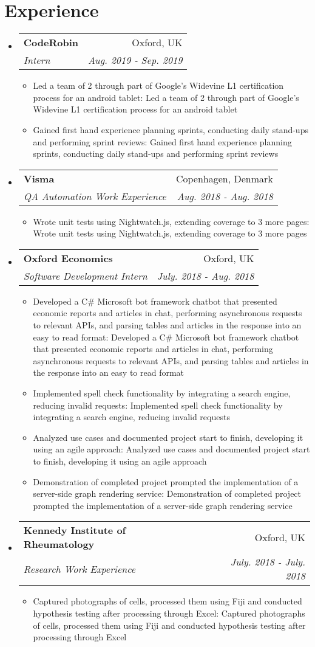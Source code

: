 \documentclass[a4paper,11pt]{article}
\makeatletter
\def \ifempty#1{\def\temp{#1} \ifx\temp\empty }
\newcommand{\resumeItem}[2]{
  \item\small{
  	\ifempty{#1}#2\else\textbf{#1}{: #2 \vspace{-2pt}}\fi
  }
}
\newcommand{\resumeSubheading}[4]{
  \vspace{-1pt}\item
    \begin{tabular*}{0.97\textwidth}{l@{\extracolsep{\fill}}r}
      \textbf{#1} & #2 \\
      \textit{\small#3} & \textit{\small #4} \\
    \end{tabular*}\vspace{-5pt}
}
\newcommand{\resumeSubHeadingListStart}{\begin{itemize}[leftmargin=*]}
\newcommand{\resumeSubHeadingListEnd}{\end{itemize}}
\newcommand{\resumeItemListStart}{\begin{itemize}}
\newcommand{\resumeItemListEnd}{\end{itemize}\vspace{-5pt}}
\makeatother
\begin{document}
\section{Experience}
  \resumeSubHeadingListStart
    \resumeSubheading
      {CodeRobin}{Oxford, UK}
      {Intern}{Aug. 2019 - Sep. 2019}
      \resumeItemListStart
      	\resumeItem{}
          {Led a team of 2 through part of Google's Widevine L1 certification process 
          for an android tablet}
        \resumeItem{}
          {Gained first hand experience planning sprints, conducting daily 
          stand-ups and performing sprint reviews}
      \resumeItemListEnd
        \resumeSubheading
      {Visma}{Copenhagen, Denmark}
      {QA Automation Work Experience}{Aug. 2018 - Aug. 2018}
      \resumeItemListStart
      	\resumeItem{}
          {Wrote unit tests using Nightwatch.js, extending coverage to 3 more pages}
      \resumeItemListEnd
        \resumeSubheading
      {Oxford Economics}{Oxford, UK}
      {Software Development Intern}{July. 2018 - Aug. 2018}
      \resumeItemListStart
      	\resumeItem{}
          {Developed a C\# Microsoft bot framework chatbot that presented economic 
          reports and articles in chat, performing asynchronous requests to relevant APIs,
          and parsing tables and articles in the response into an easy to read format}
        \resumeItem{}  
          {Implemented spell check functionality by integrating a search 
          engine, reducing invalid requests}
        \resumeItem{}
          {Analyzed use cases and documented project start to finish, 
          developing it using an agile approach}
        \resumeItem{}
          {Demonstration of completed project prompted the 
          implementation of a server-side graph rendering service}
      \resumeItemListEnd
        \resumeSubheading
      {Kennedy Institute of Rheumatology}{Oxford, UK}
      {Research Work Experience}{July. 2018 - July. 2018}
      \resumeItemListStart
      	\resumeItem{}
          {Captured photographs of cells, processed them using Fiji and 
          conducted hypothesis testing after processing through Excel}
      \resumeItemListEnd
    
  \resumeSubHeadingListEnd


\end{document}
